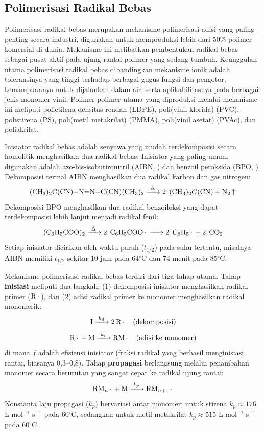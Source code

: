 \documentclass[12pt,a4paper,openany]{book}
\begin{document}
\subsection{Polimerisasi Radikal Bebas}

Polimerisasi radikal bebas merupakan mekanisme polimerisasi adisi yang paling penting secara industri, digunakan untuk memproduksi lebih dari 50\% polimer komersial di dunia. Mekanisme ini melibatkan pembentukan radikal bebas sebagai pusat aktif pada ujung rantai polimer yang sedang tumbuh. Keunggulan utama polimerisasi radikal bebas dibandingkan mekanisme ionik adalah toleransinya yang tinggi terhadap berbagai gugus fungsi dan pengotor, kemampuannya untuk dijalankan dalam air, serta aplikabilitasnya pada berbagai jenis monomer vinil. Polimer-polimer utama yang diproduksi melalui mekanisme ini meliputi polietilena densitas rendah (LDPE), poli(vinil klorida) (PVC), polistirena (PS), poli(metil metakrilat) (PMMA), poli(vinil asetat) (PVAc), dan poliakrilat.

Inisiator radikal bebas adalah senyawa yang mudah terdekomposisi secara homolitik menghasilkan dua radikal bebas. Inisiator yang paling umum digunakan adalah azo-bis-isobutironitril (AIBN, ) dan benzoil peroksida (BPO, ). Dekomposisi termal AIBN menghasilkan dua radikal karbon dan gas nitrogen:
\begin{equation}
  \ce{(CH3)2C(CN)-N=N-C(CN)(CH3)2 ->[\Delta] 2\;(CH3)2\dot{C}(CN) + N2 ^}
\end{equation}
Dekomposisi BPO menghasilkan dua radikal benzoiloksi yang dapat terdekomposisi lebih lanjut menjadi radikal fenil:
\begin{equation}
  \ce{(C6H5COO)2 ->[\Delta] 2\;C6H5COO. -> 2\;C6H5. + 2\;CO2}
\end{equation}
Setiap inisiator dicirikan oleh waktu paruh ($t_{1/2}$) pada suhu tertentu, misalnya AIBN memiliki $t_{1/2}$ sekitar 10 jam pada 64$^\circ$C dan 74 menit pada 85$^\circ$C.

Mekanisme polimerisasi radikal bebas terdiri dari tiga tahap utama. Tahap \textbf{inisiasi} meliputi dua langkah: (1) dekomposisi inisiator menghasilkan radikal primer ($\ce{R.}$), dan (2) adisi radikal primer ke monomer menghasilkan radikal monomerik:
\begin{equation}
  \ce{I ->[$k_d$] 2R.} \quad \text{(dekomposisi)}
\end{equation}
\begin{equation}
  \ce{R. + M ->[$k_i$] RM.} \quad \text{(adisi ke monomer)}
\end{equation}
di mana $f$ adalah efisiensi inisiator (fraksi radikal yang berhasil menginisiasi rantai, biasanya 0,3--0,8). Tahap \textbf{propagasi} berlangsung melalui penambahan monomer secara berurutan yang sangat cepat ke radikal ujung rantai:
\begin{equation}
  \ce{RM_n. + M ->[$k_p$] RM_{n+1}.}
\end{equation}
Konstanta laju propagasi ($k_p$) bervariasi antar monomer; untuk stirena $k_p \approx 176$ L mol$^{-1}$ s$^{-1}$ pada 60$^\circ$C, sedangkan untuk metil metakrilat $k_p \approx 515$ L mol$^{-1}$ s$^{-1}$ pada 60$^\circ$C.
\end{document}
